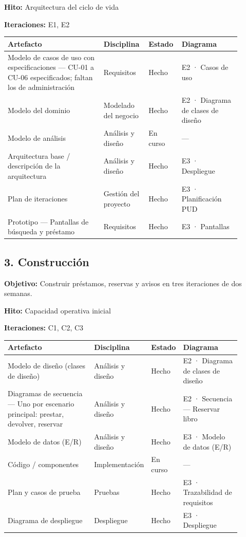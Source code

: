 \documentclass[11pt,a4paper]{article}
\begin{document}
\textbf{Hito:} Arquitectura del ciclo de vida

\textbf{Iteraciones:} E1, E2

{\small
\begin{longtable}{@{}>{\raggedright\arraybackslash}p{0.396\linewidth}>{\raggedright\arraybackslash}p{0.167\linewidth}>{\raggedright\arraybackslash}p{0.091\linewidth}>{\raggedright\arraybackslash}p{0.244\linewidth}@{}}
\toprule
\textbf{Artefacto} & \textbf{Disciplina} & \textbf{Estado} & \textbf{Diagrama} \\
\midrule
\endhead
Modelo de casos de uso con especificaciones — CU-01 a CU-06 especificados; faltan los de administración & Requisitos & Hecho & E2 · Casos de uso \\
Modelo del dominio & Modelado del negocio & Hecho & E2 · Diagrama de clases de diseño \\
Modelo de análisis & Análisis y diseño & En curso & — \\
Arquitectura base / descripción de la arquitectura & Análisis y diseño & Hecho & E3 · Despliegue \\
Plan de iteraciones & Gestión del proyecto & Hecho & E3 · Planificación PUD \\
Prototipo — Pantallas de búsqueda y préstamo & Requisitos & Hecho & E3 · Pantallas \\
\bottomrule
\end{longtable}}

\subsection*{3. Construcción}

\textbf{Objetivo:} Construir préstamos, reservas y avisos en tres iteraciones de dos semanas.

\textbf{Hito:} Capacidad operativa inicial

\textbf{Iteraciones:} C1, C2, C3

{\small
\begin{longtable}{@{}>{\raggedright\arraybackslash}p{0.380\linewidth}>{\raggedright\arraybackslash}p{0.172\linewidth}>{\raggedright\arraybackslash}p{0.091\linewidth}>{\raggedright\arraybackslash}p{0.254\linewidth}@{}}
\toprule
\textbf{Artefacto} & \textbf{Disciplina} & \textbf{Estado} & \textbf{Diagrama} \\
\midrule
\endhead
Modelo de diseño (clases de diseño) & Análisis y diseño & Hecho & E2 · Diagrama de clases de diseño \\
Diagramas de secuencia — Uno por escenario principal: prestar, devolver, reservar & Análisis y diseño & Hecho & E2 · Secuencia — Reservar libro \\
Modelo de datos (E/R) & Análisis y diseño & Hecho & E3 · Modelo de datos (E/R) \\
Código / componentes & Implementación & En curso & — \\
Plan y casos de prueba & Pruebas & Hecho & E3 · Trazabilidad de requisitos \\
Diagrama de despliegue & Despliegue & Hecho & E3 · Despliegue \\
\bottomrule
\end{longtable}}
\end{document}
